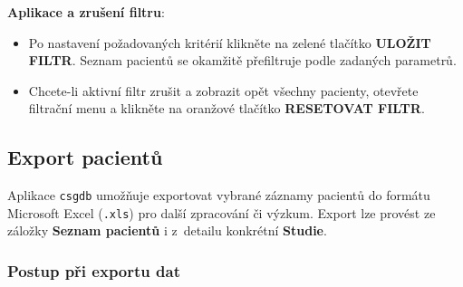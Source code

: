 \documentclass[12pt,a4paper]{article}
\begin{document}
\textbf{Aplikace a zrušení filtru}:
\begin{itemize}
    \item Po nastavení požadovaných kritérií klikněte na zelené tlačítko \textbf{ULOŽIT FILTR}. Seznam pacientů se okamžitě přefiltruje podle zadaných parametrů.
    \item Chcete-li aktivní filtr zrušit a zobrazit opět všechny pacienty, otevřete filtrační menu a klikněte na oranžové tlačítko \textbf{RESETOVAT FILTR}.
\end{itemize}

\subsection{Export pacientů}

Aplikace \texttt{csgdb} umožňuje exportovat vybrané záznamy pacientů do formátu Microsoft Excel (\texttt{.xls}) pro další zpracování či výzkum. Export lze provést ze záložky \textbf{Seznam pacientů} i z~detailu konkrétní \textbf{Studie}.

\subsubsection{Postup při exportu dat}
\end{document}
